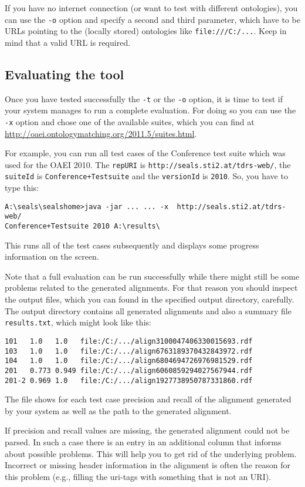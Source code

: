\documentclass{article}
\def\file#1{\textcolor{grayy}{\texttt{#1}}}
\begin{document}
If you have no internet connection (or want to test with different ontologies), you can use the \verb|-o| option and specify a second and third parameter, which have to be URLs pointing to the (locally stored) ontologies like \file{file:///C:/...}.  Keep in mind that a valid URL is required.

\subsection{Evaluating the tool}
\label{sub:test-eval}

Once you have tested successfully the \verb|-t| or the \verb|-o| option, it is time to test if your system manages to run a complete evaluation. For doing so you can use the \verb|-x| option and chose one of the available suites, which you can find at \url{http://oaei.ontologymatching.org/2011.5/suites.html}.

For example, you can run all test cases of the Conference test suite which was used for the OAEI 2010. The \verb|repURI| is \verb|http://seals.sti2.at/tdrs-web/|, the \verb|suiteId| is \verb|Conference+Testsuite| and the \verb|versionId| is \verb|2010|. So, you have to type this:
\begin{verbatim}
A:\seals\sealshome>java -jar ... ... -x  http://seals.sti2.at/tdrs-web/
Conference+Testsuite 2010 A:\results\
\end{verbatim}
This runs all of the test cases subsequently and displays some progress information on the screen.

Note that a full evaluation can be run successfully while there might still be some problems related to the generated alignments. For that reason you should inspect the output files, which you can found in the specified output directory, carefully. The output directory contains all generated alignments and also a summary file \verb|results.txt|, which might look like this:
\begin{verbatim}
101   1.0   1.0   file:/C:/.../align3100047406330015693.rdf
103   1.0   1.0   file:/C:/.../align6763189370432843972.rdf
104   1.0   1.0   file:/C:/.../align6804694726976981529.rdf
201   0.773 0.949 file:/C:/.../align6060859294027567944.rdf
201-2 0.969 1.0   file:/C:/.../align1927738950787331860.rdf
\end{verbatim}
The file shows for each test case precision and recall of the alignment generated by your system as well as the path to the generated alignment.

If precision and recall values are missing, the generated alignment could not be parsed. In such a case there is an entry in an additional column that informs about possible problems. This will help you to get rid of the underlying problem. Incorrect or missing header information in the alignment is often the reason for this problem (e.g., filling the uri-tags with something that is not an URI).
\end{document}
